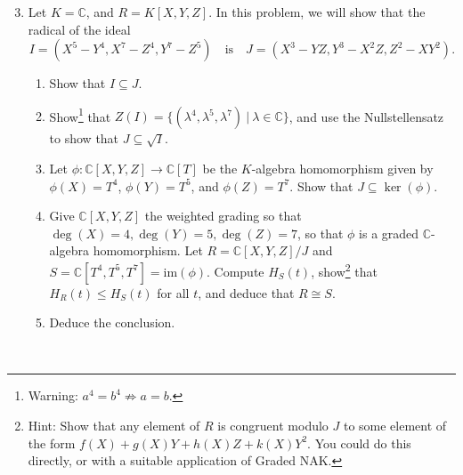\documentclass[12pt]{amsart}
\newcommand{\C}{\mathbb{C}}
\begin{document}
\begin{enumerate}
\setcounter{enumi}{2}


\item Let $K=\C$, and $R=K[X,Y,Z]$. In this problem, we will show that the radical of the ideal
\[ I= (X^5 - Y^4, X^7-Z^4, Y^7-Z^5) \quad \text{is} \quad J=(X^3-YZ, Y^3-X^2Z, Z^2-XY^2).\]
\begin{enumerate}
\item Show that $I\subseteq J$.
\item Show\footnote{Warning: $a^4=b^4 \not\Rightarrow a=b$.} that $Z(I)=\{ (\lambda^4,\lambda^5,\lambda^7) \ | \ \lambda \in \C\}$, and use the Nullstellensatz to show that $J \subseteq \sqrt{I}$.
\item Let $\phi: \C[X,Y,Z] \to \C[T]$ be the $K$-algebra homomorphism given by $\phi(X) = T^4$, $\phi(Y)=T^5$, and $\phi(Z)=T^7$. Show that $J\subseteq \ker(\phi)$.
\item Give $\C[X,Y,Z]$ the weighted grading so that $\deg(X)=4, \deg(Y)=5, \deg(Z)=7$, so that $\phi$ is a graded $\C$-algebra homomorphism. 
Let $R=\C[X,Y,Z]/J$ and $S=\C[T^4,T^5,T^7] = \mathrm{im}(\phi)$. Compute $H_S(t)$, show\footnote{Hint: Show that any element of $R$ is congruent modulo $J$ to some element of the form ${f(X) + g(X)Y + h(X) Z + k(X) Y^2}$. You could do this directly, or with a suitable application of Graded NAK.} that $H_R(t) \leq H_S(t)$ for all $t$, and deduce that $R\cong S$.
\item Deduce the conclusion.
\end{enumerate}

\





\end{enumerate}
\end{document}

